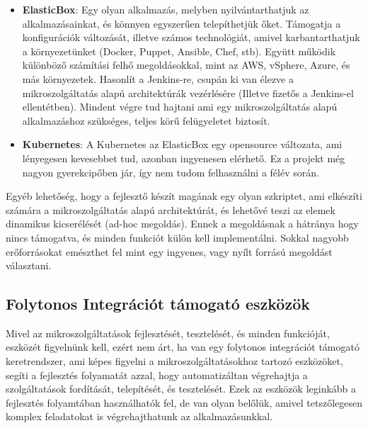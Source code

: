 \documentclass[11pt,magyar,a4paper,twoside,]{report}
\begin{document}
\begin{itemize}
\item
  \textbf{ElasticBox}\citep{elasticbox}: Egy olyan alkalmazás, melyben
  nyilvántarthatjuk az alkalmazásainkat, és könnyen egyszerűen
  telepíthetjük őket. Támogatja a konfigurációk változását, illetve
  számos technológiát, amivel karbantarthatjuk a környezetünket (Docker,
  Puppet, Ansible, Chef, stb). Együtt működik különböző számítási felhő
  megoldásokkal, mint az AWS, vSphere, Azure, és más környezetek.
  Hasonlít a Jenkins-re, csupán ki van élezve a mikroszolgáltatás alapú
  architektúrák vezérlésére (Illetve fizetős a Jenkins-el ellentétben).
  Mindent végre tud hajtani ami egy mikroszolgáltatás alapú
  alkalmazáshoz szükséges, teljes körű felügyeletet biztosít.
  \citep{jenkins-elasticbox}
\item
  \textbf{Kubernetes}\citep{kubernetes}: A Kubernetes az ElasticBox egy
  opensource változata, ami lényegesen kevesebbet tud, azonban
  ingyenesen elérhető. Ez a projekt még nagyon gyerekcipőben jár, így
  nem tudom felhasználni a félév során.
\end{itemize}

Egyéb lehetőség, hogy a fejlesztő készít magának egy olyan szkriptet,
ami elkészíti számára a mikroszolgáltatás alapú architektúrát, és
lehetővé teszi az elemek dinamikus kicserélését (ad-hoc megoldás). Ennek
a megoldásnak a hátránya hogy nincs támogatva, és minden funkciót külön
kell implementálni. Sokkal nagyobb erőforrásokat emészthet fel mint egy
ingyenes, vagy nyílt forrású megoldást választani.

\subsection{Folytonos Integrációt támogató
eszközök}\label{folytonos-integruxe1ciuxf3t-tuxe1mogatuxf3-eszkuxf6zuxf6k}

Mivel az mikroszolgáltatások fejlesztését, tesztelését, és minden
funkcióját, eszközét figyelnünk kell, ezért nem árt, ha van egy
folytonos integrációt támogató keretrendszer, ami képes figyelni a
mikroszolgáltatásokhoz tartozó eszközöket, segíti a fejlesztés
folyamatát azzal, hogy automatizáltan végrehajtja a szolgáltatások
fordítását, telepítését, és tesztelését. Ezek az eszközök leginkább a
fejlesztés folyamtában használhatók fel, de van olyan belőlük, amivel
tetszőlegesen komplex feladatokat is végrehajthatunk az
alkalmazásunkkal.
\end{document}
